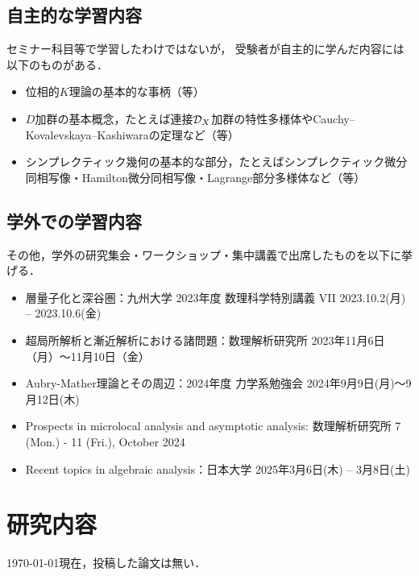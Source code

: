 \subsection{自主的な学習内容}
セミナー科目等で学習したわけではないが，
受験者が自主的に学んだ内容には
以下のものがある．
\begin{itemize}
  \item 位相的\(K\)理論の基本的な事柄（\cite[1,2章]{Ati22}等）
  \item \(D\)加群の基本概念，たとえば連接\(\mathcal{D}_X\)加群の特性多様体やCauchy--Kovalevskaya--Kashiwaraの定理など（\cite{Kas08}等）
  \item シンプレクティック幾何の基本的な部分，たとえばシンプレクティック微分同相写像・Hamilton微分同相写像・Lagrange部分多様体など（\cite{HZ94}等）
\end{itemize}
\subsection{学外での学習内容}

その他，学外の研究集会・ワークショップ・集中講義で出席したものを以下に挙げる．
\begin{itemize}
    \item 層量子化と深谷圏：九州大学 2023年度 数理科学特別講義 VII 2023.10.2(月) -- 2023.10.6(金)
    \item 超局所解析と漸近解析における諸問題：数理解析研究所 2023年11月6日（月）～11月10日（金）
    \item Aubry-Mather理論とその周辺：2024年度 力学系勉強会 2024年9月9日(月)〜9月12日(木)
    \item Prospects in microlocal analysis and asymptotic analysis: 数理解析研究所 7 (Mon.) - 11 (Fri.), October 2024
    \item Recent topics in algebraic analysis：日本大学 2025年3月6日(木) -- 3月8日(土)
\end{itemize}

\section{研究内容}

\today 現在，投稿した論文は無い．

